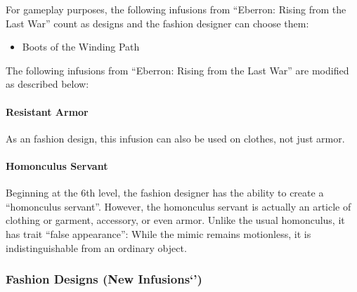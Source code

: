\documentclass[twocolumn]{dndbook}
\begin{document}
For gameplay purposes, the following infusions from ``Eberron: Rising from the Last War'' count as designs and the fashion designer can choose them:
\begin{itemize}
    \item Boots of the Winding Path
\end{itemize}

The following infusions from ``Eberron: Rising from the Last War'' are modified as described below:
\paragraph{Resistant Armor}
As an fashion design, this infusion can also be used on clothes, not just armor.


\paragraph{Homonculus Servant}
Beginning at the 6th level, the fashion designer has the ability to create a ``homonculus servant''.
However, the homonculus servant is actually an article of clothing or garment, accessory, or even armor.
Unlike the usual homonculus, it has trait ``false appearance'':
While the mimic remains motionless, it is indistinguishable from an ordinary object.

\subsubsection{Fashion Designs (New Infusions`')}
\end{document}
